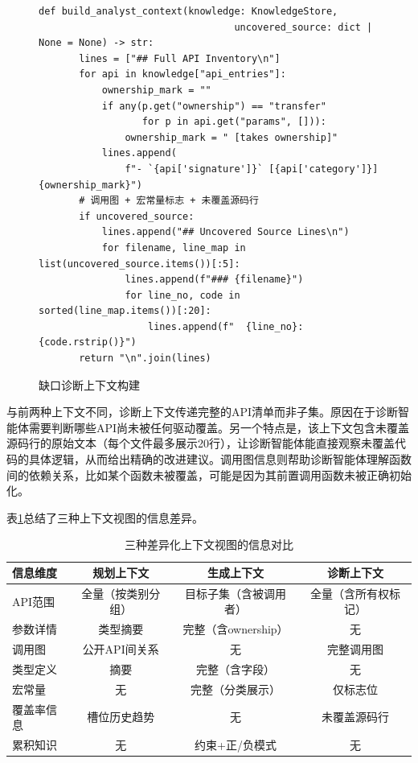 \begin{figure}[H]
    \centering
    \begin{lstlisting}[style=style@python]
   def build_analyst_context(knowledge: KnowledgeStore,
                                  uncovered_source: dict | None = None) -> str:
       lines = ["## Full API Inventory\n"]
       for api in knowledge["api_entries"]:
           ownership_mark = ""
           if any(p.get("ownership") == "transfer"
                  for p in api.get("params", [])):
               ownership_mark = " [takes ownership]"
           lines.append(
               f"- `{api['signature']}` [{api['category']}]{ownership_mark}")
       # 调用图 + 宏常量标志 + 未覆盖源码行
       if uncovered_source:
           lines.append("## Uncovered Source Lines\n")
           for filename, line_map in list(uncovered_source.items())[:5]:
               lines.append(f"### {filename}")
               for line_no, code in sorted(line_map.items())[:20]:
                   lines.append(f"  {line_no}: {code.rstrip()}")
       return "\n".join(lines)
    \end{lstlisting}
    \caption{缺口诊断上下文构建}
    \label{fig:analyst-context}
\end{figure}

与前两种上下文不同，诊断上下文传递完整的API清单而非子集。原因在于诊断智能体需要判断哪些API尚未被任何驱动覆盖。另一个特点是，该上下文包含未覆盖源码行的原始文本（每个文件最多展示20行），让诊断智能体能直接观察未覆盖代码的具体逻辑，从而给出精确的改进建议。调用图信息则帮助诊断智能体理解函数间的依赖关系，比如某个函数未被覆盖，可能是因为其前置调用函数未被正确初始化。

表\ref{tab:context-comparison}总结了三种上下文视图的信息差异。

\begin{table}[H]
    \centering
    \caption{三种差异化上下文视图的信息对比}
    \label{tab:context-comparison}
    \begin{tabular}{lccc}
        \toprule
        信息维度 & 规划上下文 & 生成上下文 & 诊断上下文 \\
        \midrule
        API范围 & 全量（按类别分组） & 目标子集（含被调用者） & 全量（含所有权标记） \\
        参数详情 & 类型摘要 & 完整（含ownership） & 无 \\
        调用图 & 公开API间关系 & 无 & 完整调用图 \\
        类型定义 & 摘要 & 完整（含字段） & 无 \\
        宏常量 & 无 & 完整（分类展示） & 仅标志位 \\
        覆盖率信息 & 槽位历史趋势 & 无 & 未覆盖源码行 \\
        累积知识 & 无 & 约束+正/负模式 & 无 \\
        \bottomrule
    \end{tabular}
\end{table}

